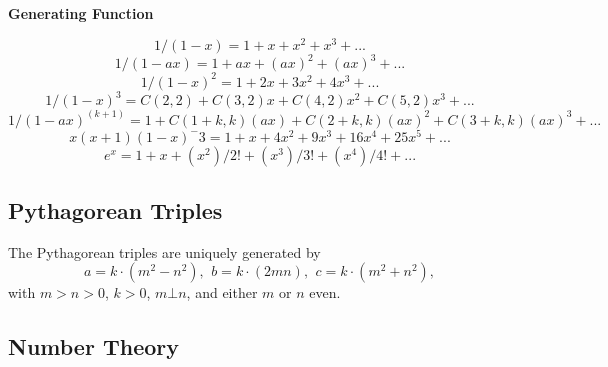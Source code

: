 \textbf{Generating Function}

$$ 1/(1 - x) = 1 + x + x^2 + x^3 + ... $$
$$ 1/(1 - ax) = 1 + ax + (ax)^2 + (ax)^3 + ... $$
$$ 1/(1 - x)^2 = 1 + 2x + 3x^2 + 4x^3 + ... $$
$$ 1/(1 - x)^3 = C(2, 2) + C(3, 2)x + C(4, 2)x^2 + C(5, 2)x^3 + ... $$
$$ 1/(1 - ax)^(k + 1) = 1 + C(1 + k, k)(ax) + C(2 + k, k)(ax)^2 + C(3 + k, k)(ax)^3 + ... $$
$$ x(x + 1)(1 - x)^-3 = 1 + x + 4x^2 + 9x^3 + 16x^4 + 25x^5 + ... $$
$$ e^x = 1 + x + (x^2)/2! + (x^3)/3! + (x^4)/4! + ... $$

\subsection{Pythagorean Triples}
 The Pythagorean triples are uniquely generated by
 \[ a=k\cdot (m^{2}-n^{2}),\ \,b=k\cdot (2mn),\ \,c=k\cdot (m^{2}+n^{2}), \]
 with $m > n > 0$, $k > 0$, $m \bot n$, and either $m$ or $n$ even.


\subsection{Number Theory}

